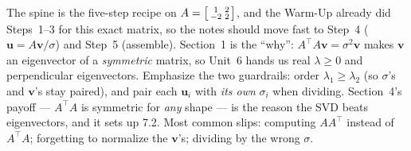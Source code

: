 \documentclass[10pt]{article}
\newcommand{\uu}{\mathbf{u}}
\newcommand{\vv}{\mathbf{v}}
\newcommand{\T}{^{\top}}
\begin{document}
\begin{teachernote}
The spine is the five-step recipe on $A=\begin{bsmallmatrix} 1 & 2\\ -2 & 2 \end{bsmallmatrix}$, and the
Warm-Up already did Steps~1--3 for this exact matrix, so the notes should move fast to Step~4
($\uu=A\vv/\sigma$) and Step~5 (assemble). Section~1 is the ``why'': $A\T A\vv=\sigma^2\vv$ makes $\vv$
an eigenvector of a \emph{symmetric} matrix, so Unit~6 hands us real $\lambda\ge0$ and perpendicular
eigenvectors. Emphasize the two guardrails: order $\lambda_1\ge\lambda_2$ (so $\sigma$'s and $\vv$'s
stay paired), and pair each $\uu_i$ with \emph{its own} $\sigma_i$ when dividing. Section~4's payoff ---
$A\T A$ is symmetric for \emph{any} shape --- is the reason the SVD beats eigenvectors, and it sets up
7.2. Most common slips: computing $AA\T$ instead of $A\T A$; forgetting to normalize the $\vv$'s;
dividing by the wrong $\sigma$.
\end{teachernote}
\end{document}
